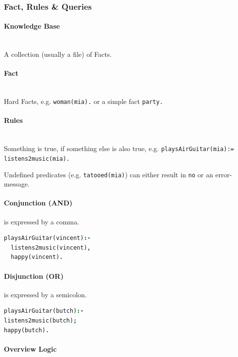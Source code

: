 \subsubsection{Fact, Rules \& Queries}

\paragraph{Knowledge Base} \hfill \\
	A collection (usually a file) of Facts.

\paragraph{Fact} \hfill \\
	Hard Facts, e.g. \lstinline|woman(mia).| or a simple fact \lstinline|party.|

\paragraph{Rules} \hfill \\
	Something is true, if something else is also true, e.g.  \lstinline|playsAirGuitar(mia):= listens2music(mia).|


Undefined predicates (e.g. \lstinline|tatooed(mia)|) can either result in \lstinline|no| or an error-message.

\paragraph{Conjunction (AND)}

is expressed by a comma.
\begin{lstlisting}[language=Prolog]
playsAirGuitar(vincent):-
  listens2music(vincent),
  happy(vincent).
\end{lstlisting}


\paragraph{Disjunction (OR)}

is expressed by a semicolon.
\begin{lstlisting}[language=Prolog]
playsAirGuitar(butch):-
listens2music(butch);
happy(butch).
\end{lstlisting}

\paragraph{Overview Logic} \hfill \\ 

